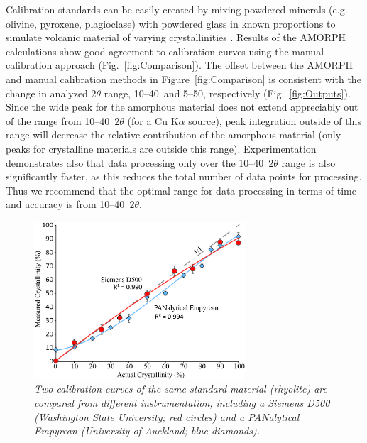\documentclass[preprint, a4paper]{elsarticle}
\begin{document}
	Calibration standards can be easily created by mixing
powdered minerals (e.g. olivine, pyroxene, plagioclase) with powdered glass in known
proportions to simulate volcanic material of varying crystallinities \citep[e.g.,][]{rowe2012, wall2014}.
Results of the AMORPH calculations show good agreement to calibration curves using the manual
calibration approach (Fig.~\ref{fig:Comparison}). The offset between the AMORPH and manual calibration methods
in Figure~\ref{fig:Comparison} is consistent with the change in analyzed $2\theta$ range, 10--40\degree~and 5--50\degree,
respectively (Fig.~\ref{fig:Outputs}). Since the wide peak for the amorphous material does not extend
appreciably out of the range from 10--40\degree~$2\theta$ (for a Cu K$\alpha$ source), peak integration
outside of this range will decrease the relative contribution of the amorphous material
(only peaks for crystalline materials are outside this range). Experimentation demonstrates also that data processing only over the 10--40\degree~$2\theta$ range is also significantly faster, as this reduces the total number of data points for processing. Thus we recommend that the optimal range for data processing in terms of time and accuracy is from 10--40\degree~$2\theta$.


\begin{figure}[!ht]
\centering
\includegraphics[width=0.7\textwidth]{figures/instruments.jpg}
\caption{\it Two calibration curves of the same standard material (rhyolite) are compared from different instrumentation, including a Siemens D500 (Washington State University; red circles) and a PANalytical Empyrean (University of Auckland; blue diamonds).\label{fig:intruments}}
\end{figure}
\end{document}
